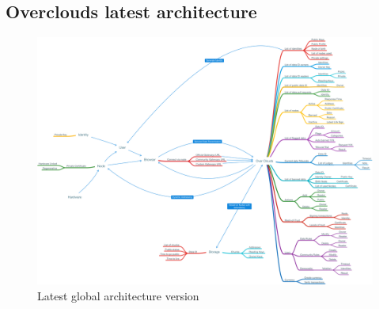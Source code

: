 
\subsection{Overclouds latest architecture}

\begin{figure}[htpb]
\centering
\begin{adjustbox}{center}
\includegraphics[scale=0.21]{annexes/architecture/Overclouds-Architecture-Draft-2-Latest.png}
\end{adjustbox}
\caption{Latest global architecture version
\label{fig:latest-architecture}}  
\end{figure}


